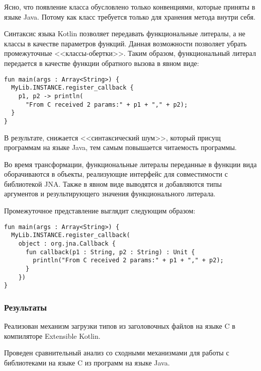 Ясно, что появление класса  обусловлено только конвенциями, которые приняты в языке Java.
Потому как класс требуется только для хранения метода  внутри себя.

Синтаксис языка Kotlin позволяет передавать функциональные литералы, а не классы в качестве параметров функций.
Данная возможности позволяет убрать промежуточные <<классы-обертки>>.
Таким образом, функциональный литерал передается в качестве функции обратного вызова в явном виде:
\begin{code}\begin{lstlisting}[caption={Пример передачи функционального литерала в качестве функции обратного вызова.}, label=kotlin-callback-example]
fun main(args : Array<String>) {
  MyLib.INSTANCE.register_callback {
    p1, p2 -> println(
      "From C received 2 params:" + p1 + "," + p2);
  }
}
\end{lstlisting}\end{code}

В результате, снижается <<синтаксический шум>>, который присущ программам на языке Java, тем самым повышается читаемость программы.

Во время трансформации, функциональные литералы переданные в функции вида  оборачиваются в объекты, реализующие интерфейс  для совместимости с библиотекой JNA.
Также в явном виде выводятся и добавляются типы аргументов и результирующего значения функционального литерала.

Промежуточное представление выглядит следующим образом:
\begin{code}\begin{lstlisting}[caption={Промежуточное представление программы с трансформацией функции обратного вызова.}, label=transitional-callback-representation]
fun main(args : Array<String>) {
  MyLib.INSTANCE.register_callback(
    object : org.jna.Callback {
      fun callback(p1 : String, p2 : String) : Unit {
        println("From C received 2 params:" + p1 + "," + p2);
      }
    })
}
\end{lstlisting}\end{code}

\subsubsection{Результаты}
Реализован механизм загрузки типов из заголовочных файлов на языке C в компиляторе Extensible Kotlin.

Проведен сравнительный анализ со сходными механизмами для работы с библиотеками на языке C из программ на языке Java.